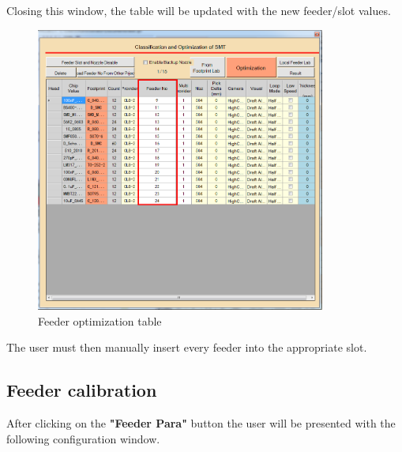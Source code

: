 \documentclass[a4paper,10pt]{report}
\begin{document}
Closing this window, the table will be updated with the new feeder/slot values.
\begin{figure}[!htb]
 \centering
 \includegraphics[width=0.85\textwidth]{scrot20.png}
 \caption{Feeder optimization table}
\end{figure}
The user must then manually insert every feeder into the appropriate slot.
\newpage
\subsection{Feeder calibration}
After clicking on the \textbf{"Feeder Para"} button the user will be presented with the following configuration window.
\end{document}
